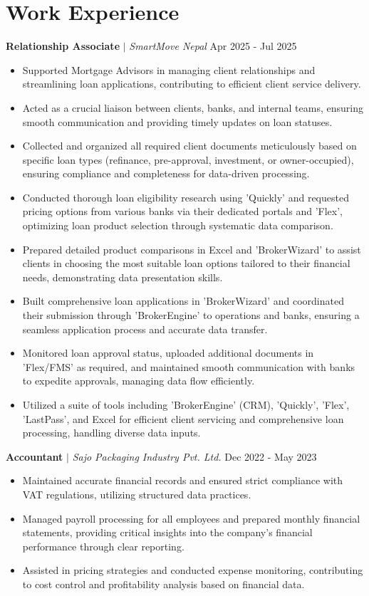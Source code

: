 \documentclass[10pt, letterpaper]{article}
\begin{document}
\section{Work Experience}
\noindent\textbf{Relationship Associate} $|$ \textit{SmartMove Nepal} \hfill Apr 2025 - Jul 2025
\begin{itemize}[leftmargin=0.15in, topsep=0pt, partopsep=0pt, itemsep=-2pt]
    \item Supported Mortgage Advisors in managing client relationships and streamlining loan applications, contributing to efficient client service delivery.
    \item Acted as a crucial liaison between clients, banks, and internal teams, ensuring smooth communication and providing timely updates on loan statuses.
    \item Collected and organized all required client documents meticulously based on specific loan types (refinance, pre-approval, investment, or owner-occupied), ensuring compliance and completeness for data-driven processing.
    \item Conducted thorough loan eligibility research using 'Quickly' and requested pricing options from various banks via their dedicated portals and 'Flex', optimizing loan product selection through systematic data comparison.
    \item Prepared detailed product comparisons in Excel and 'BrokerWizard' to assist clients in choosing the most suitable loan options tailored to their financial needs, demonstrating data presentation skills.
    \item Built comprehensive loan applications in 'BrokerWizard' and coordinated their submission through 'BrokerEngine' to operations and banks, ensuring a seamless application process and accurate data transfer.
    \item Monitored loan approval status, uploaded additional documents in 'Flex/FMS' as required, and maintained smooth communication with banks to expedite approvals, managing data flow efficiently.
    \item Utilized a suite of tools including 'BrokerEngine' (CRM), 'Quickly', 'Flex', 'LastPass', and Excel for efficient client servicing and comprehensive loan processing, handling diverse data inputs.
\end{itemize}
\vspace{4pt}
\noindent\textbf{Accountant} $|$ \textit{Sajo Packaging Industry Pvt. Ltd.} \hfill Dec 2022 - May 2023
\begin{itemize}[leftmargin=0.15in, topsep=0pt, partopsep=0pt, itemsep=-2pt]
    \item Maintained accurate financial records and ensured strict compliance with VAT regulations, utilizing structured data practices.
    \item Managed payroll processing for all employees and prepared monthly financial statements, providing critical insights into the company's financial performance through clear reporting.
    \item Assisted in pricing strategies and conducted expense monitoring, contributing to cost control and profitability analysis based on financial data.
\end{itemize}
\end{document}
